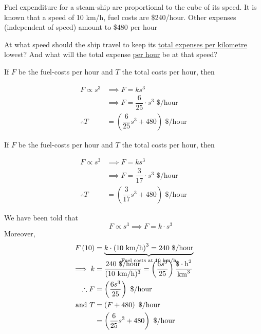 \documentclass[14pt,fleqn]{extarticle}
\newcommand\dph{\text{ \$/hour}}
\newcommand\kmph{\text{ km/h}}
\newcommand\konst{\left( \frac{6s^3}{25} \right)}
\begin{document}
\begin{problem}
\statement
	
Fuel expenditure for a steam-ship are
proportional to the cube of its speed. It is
known that a speed of 10 km/h, fuel costs
are \$240/hour. Other expenses (independent
of speed) amount to \$480 per hour \newline 

At what speed should the ship travel  to keep
its \underline{total expenses per kilometre} lowest? And 
what will the total expense \underline{per hour} be at that speed? 
%
\begin{step}
	\begin{options}
		\correct
      
      If $F$ be the fuel-costs per hour and $T$ the total costs per hour, then 
		
      \begin{align}
        F \propto s^3 &\implies F = ks^3 \\
        &\implies F =  \dfrac{6}{25}\cdot s^3 \dph    \\
        \therefore T &= \left(\dfrac{6}{25}s^3 + 480\right) \dph 
      \end{align}
      

		\incorrect

If $F$ be the fuel-costs per hour and $T$ the total costs per hour, then 
		
      \begin{align}
        F \propto s^3 &\implies F = ks^3 \\
        &\implies F =  \dfrac{3}{17}\cdot s^3 \dph    \\
        \therefore T &= \left(\dfrac{3}{17}s^3 + 480\right) \dph 
      \end{align}

	\end{options}
	\reason

	We have been told that 
	\[\qquad F \propto s^3 \implies F =k\cdot s^3  \]
	Moreover, 
      \begin{align}
        F \left(10 \right) &= \underbrace{k\cdot \left(10 \kmph \right)^3 = 240 \dph}_{\text{Fuel costs at 10\kmph}} \\[-10pt]
        \implies k &= \dfrac{240\dph}{(10 \kmph)^3} = 
        \konst \frac{\$\cdot \text{h}^2}{\text{km}^3}\\
        \therefore F &= \konst\dph \\
        \text{and } T &= \left( F+480\right) \dph \\
        &=\left(\dfrac{6}{25}s^3 + 480\right) \dph
      \end{align}
    

\end{step}
\end{problem}
\end{document}
